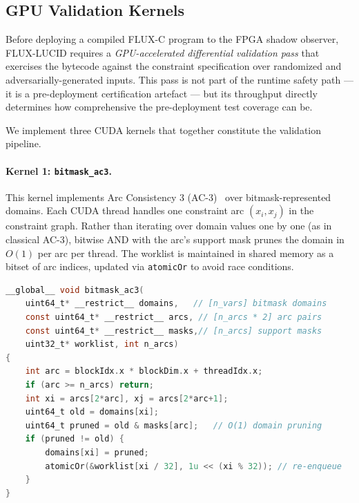 \documentclass[sigplan,review,anonymous]{acmart}
\begin{document}
\subsection{GPU Validation Kernels}
\label{sec:gpu-kernels}

Before deploying a compiled FLUX-C program to the FPGA shadow observer,
FLUX-LUCID requires a \emph{GPU-accelerated differential validation pass}
that exercises the bytecode against the constraint specification over
randomized and adversarially-generated inputs.
This pass is not part of the runtime safety path — it is a pre-deployment
certification artefact — but its throughput directly determines how
comprehensive the pre-deployment test coverage can be.

We implement three CUDA kernels that together constitute the validation
pipeline.

\paragraph{Kernel 1: \texttt{bitmask\_ac3}.}
This kernel implements Arc Consistency 3 (AC-3)~\cite{mackworth1977} over
bitmask-represented domains.
Each CUDA thread handles one constraint arc $(x_i, x_j)$ in the constraint
graph.
Rather than iterating over domain values one by one (as in classical AC-3),
bitwise AND with the arc's support mask prunes the domain in $O(1)$ per arc
per thread.
The worklist is maintained in shared memory as a bitset of arc indices,
updated via \texttt{atomicOr} to avoid race conditions.

\begin{lstlisting}[language=C, basicstyle=\ttfamily\scriptsize, frame=single]
__global__ void bitmask_ac3(
    uint64_t* __restrict__ domains,   // [n_vars] bitmask domains
    const uint64_t* __restrict__ arcs, // [n_arcs * 2] arc pairs
    const uint64_t* __restrict__ masks,// [n_arcs] support masks
    uint32_t* worklist, int n_arcs)
{
    int arc = blockIdx.x * blockDim.x + threadIdx.x;
    if (arc >= n_arcs) return;
    int xi = arcs[2*arc], xj = arcs[2*arc+1];
    uint64_t old = domains[xi];
    uint64_t pruned = old & masks[arc];   // O(1) domain pruning
    if (pruned != old) {
        domains[xi] = pruned;
        atomicOr(&worklist[xi / 32], 1u << (xi % 32)); // re-enqueue
    }
}
\end{lstlisting}
\end{document}
